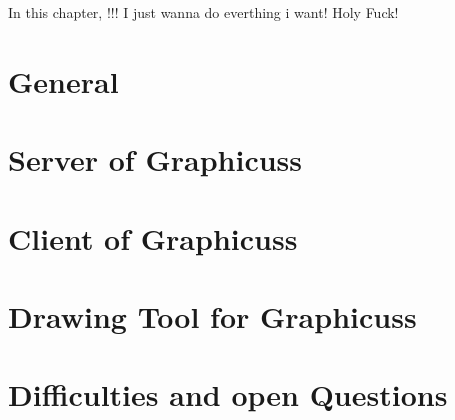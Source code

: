 In this chapter, !!! I just wanna do everthing i want! Holy Fuck!


\section{General}



\section{Server of Graphicuss}


\section{Client of Graphicuss}


\section{Drawing Tool for Graphicuss}


\section{Difficulties and open Questions}
